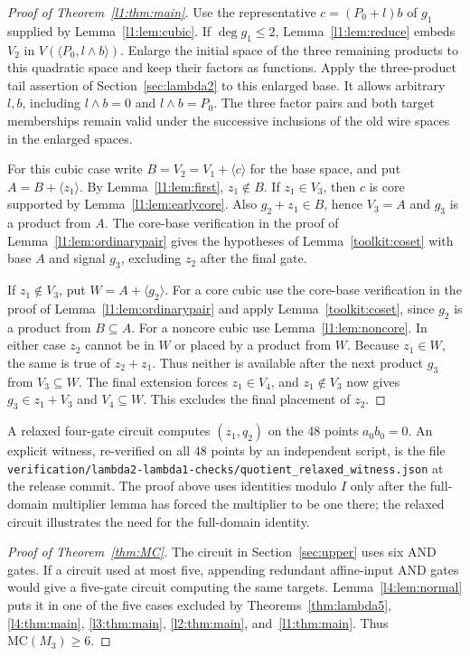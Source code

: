 \documentclass[11pt,a4paper]{article}
\theoremstyle{plain}
\theoremstyle{remark}
\theoremstyle{plain}
\begin{document}
\begin{proof}[Proof of Theorem~\ref{l1:thm:main}]
Use the representative $c=(P_0+l)b$ of $g_1$ supplied by Lemma~\ref{l1:lem:cubic}. If $\deg g_1\le2$, Lemma~\ref{l1:lem:reduce} embeds $V_2$ in $V(\langle P_0,l\wedge b\rangle)$. Enlarge the initial space of the three remaining products to this quadratic space and keep their factors as functions. Apply the three-product tail assertion of Section~\ref{sec:lambda2} to this enlarged base.
It allows arbitrary $l,b$, including $l\wedge b=0$ and
$l\wedge b=P_0$. The three factor pairs and both target memberships
remain valid under the successive inclusions of the old wire spaces
in the enlarged spaces.

For this cubic case write $B=V_2=V_1+\langle c\rangle$ for the base space, and put $A=B+\langle z_1\rangle$. By Lemma~\ref{l1:lem:first}, $z_1\notin B$. If $z_1\in V_3$, then $c$ is core supported by Lemma~\ref{l1:lem:earlycore}. Also $g_2+z_1\in B$, hence $V_3=A$ and $g_3$ is a product from $A$. The core-base verification in the proof of Lemma~\ref{l1:lem:ordinarypair} gives the hypotheses of Lemma~\ref{toolkit:coset} with base $A$ and signal $g_3$, excluding $z_2$ after the final gate.

If $z_1\notin V_3$, put $W=A+\langle g_2\rangle$. For a core cubic use the core-base verification in the proof of Lemma~\ref{l1:lem:ordinarypair} and apply Lemma~\ref{toolkit:coset}, since $g_2$ is a product from $B\subseteq A$. For a noncore cubic use Lemma~\ref{l1:lem:noncore}. In either case $z_2$ cannot be in $W$ or placed by a product from $W$. Because $z_1\in W$, the same is true of $z_2+z_1$. Thus neither is available after the next product $g_3$ from $V_3\subseteq W$. The final extension forces $z_1\in V_4$, and $z_1\notin V_3$ now gives $g_3\in z_1+V_3$ and $V_4\subseteq W$. This excludes the final placement of $z_2$.
\end{proof}

A relaxed four-gate circuit computes $(z_1,q_2)$ on the 48 points $a_0b_0=0$. An explicit witness, re-verified on all $48$ points by an independent script, is the file \nolinkurl{verification/lambda2-lambda1-checks/quotient_relaxed_witness.json} at the release commit. The proof above uses identities modulo $I$ only after the full-domain multiplier lemma has forced the multiplier to be one there; the relaxed circuit illustrates the need for the full-domain identity.

\begin{proof}[Proof of Theorem~\ref{thm:MC}]
The circuit in Section~\ref{sec:upper} uses six AND gates. If a circuit used at most five, appending redundant affine-input AND gates would give a five-gate circuit computing the same targets. Lemma~\ref{l4:lem:normal} puts it in one of the five cases excluded by Theorems~\ref{thm:lambda5}, \ref{l4:thm:main}, \ref{l3:thm:main}, \ref{l2:thm:main}, and~\ref{l1:thm:main}. Thus $\mathrm{MC}(M_3)\ge6$.
\end{proof}
\end{document}
